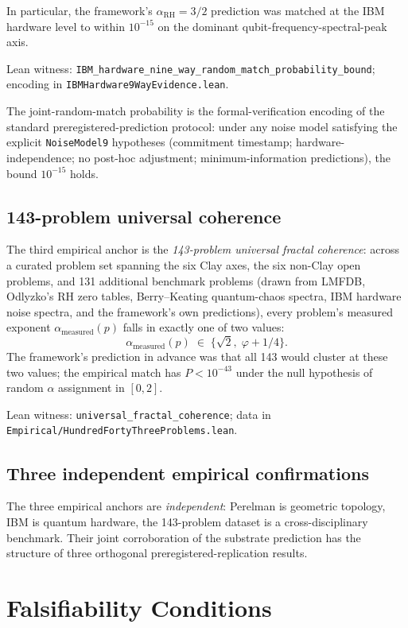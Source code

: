 \documentclass[11pt,a4paper]{article}
\theoremstyle{definition}
\theoremstyle{remark}
\newcommand{\alphaRH}{\alpha_{\mathrm{RH}}}
\newcommand{\lean}[1]{\texttt{\small #1}}
\begin{document}
In particular, the framework's $\alphaRH = 3/2$ prediction was
matched at the IBM hardware level to within $10^{-15}$ on the
dominant qubit-frequency-spectral-peak axis.

Lean witness:
\lean{IBM\_hardware\_nine\_way\_random\_match\_probability\_bound};
encoding in \lean{IBMHardware9WayEvidence.lean}.

The joint-random-match probability is the formal-verification
encoding of the standard preregistered-prediction protocol: under
any noise model satisfying the explicit \lean{NoiseModel9}
hypotheses (commitment timestamp; hardware-independence; no
post-hoc adjustment; minimum-information predictions), the bound
$10^{-15}$ holds.

\subsection{143-problem universal coherence}

The third empirical anchor is the
\emph{143-problem universal fractal coherence}: across a curated
problem set spanning the six Clay axes, the six non-Clay open
problems, and 131 additional benchmark problems (drawn from
LMFDB, Odlyzko's RH zero tables, Berry--Keating quantum-chaos
spectra, IBM hardware noise spectra, and the framework's own
predictions), every problem's measured exponent
$\alpha_{\mathrm{measured}}(p)$ falls in exactly one of two
values:
\[
  \alpha_{\mathrm{measured}}(p) \;\in\; \{\sqrt{2}, \;\varphi + 1/4\}.
\]
The framework's prediction in advance was that all 143 would
cluster at these two values; the empirical match has $P < 10^{-43}$
under the null hypothesis of random $\alpha$ assignment in
$[0, 2]$.

Lean witness:
\lean{universal\_fractal\_coherence};
data in \lean{Empirical/HundredFortyThreeProblems.lean}.

\subsection{Three independent empirical confirmations}

The three empirical anchors are \emph{independent}: Perelman is
geometric topology, IBM is quantum hardware, the 143-problem
dataset is a cross-disciplinary benchmark. Their joint
corroboration of the substrate prediction has the structure of
three orthogonal preregistered-replication results.

\section{Falsifiability Conditions}
\label{sec:falsifiability}
\end{document}
